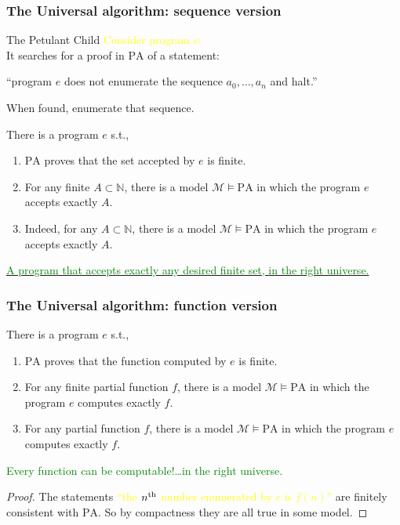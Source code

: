 \documentclass[UTF8,11pt,colorlinks,compress,openany]{beamer}%
\begin{document}
\begin{frame}\frametitle{The Universal algorithm: sequence version}
\begin{block}{The Petulant Child}
\textcolor{yellow}{Consider program $e$:}\\
It searches for a proof in $\mathrm{PA}$ of a statement:\\
\centerline{``program $e$ does not enumerate the sequence $a_0,\dots,a_n$ and halt.''}
When found, enumerate that sequence.
\end{block}
\begin{theorem}
There is a program $e$ s.t.,
\begin{enumerate}
	\item $\mathrm{PA}$ proves that the set accepted by $e$ is finite.
	\item For any finite $A\subset\mathbb{N}$, there is a model $\mathcal{M}\vDash\mathrm{PA}$ in which the program $e$ accepts exactly $A$.
	\item Indeed, for any $A\subset\mathbb{N}$, there is a model $\mathcal{M}\vDash\mathrm{PA}$ in which the program $e$ accepts exactly $A$.
\end{enumerate}
\end{theorem}
\href{http://jdh.hamkins.org/a-program-that-accepts-any-desired-finite-set-in-the-right-universe/}{\textcolor{green}{A program that accepts exactly any desired finite set, in the right universe.}}
\end{frame}

\begin{frame}\frametitle{The Universal algorithm: function version}
\begin{theorem}
There is a program $e$ s.t.,
\begin{enumerate}
	\item $\mathrm{PA}$ proves that the function computed by $e$ is finite.
	\item For any finite partial function $f$, there is a model $\mathcal{M}\vDash\mathrm{PA}$ in which the program $e$ computes exactly $f$.
	\item For any partial function $f$, there is a model $\mathcal{M}\vDash\mathrm{PA}$ in which the program $e$ computes exactly $f$.
\end{enumerate}
\end{theorem}
\textcolor{green}{Every function can be computable!\dots in the right universe.}
\begin{proof}
The statements \textcolor{yellow}{``the $n\textsuperscript{th}$ number enumerated by $e$ is $f(n)$''} are finitely consistent with $\mathrm{PA}$. So by compactness they are all true in some model.
\end{proof}
\end{frame}
\end{document}
